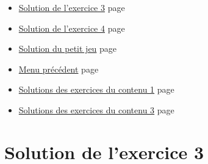 \documentclass[a4paper,11pt]{book}
\begin{document}
\clearpage

\label{orgd5de19a}
\label{page:sols-cont2}
\begin{itemize}
\item \hyperref[org34f5627]{Solution de l'exercice 3} page \pageref{page:sec8.2.1sol3}
\item \hyperref[orgea731a5]{Solution de l'exercice 4} page \pageref{page:sec8.2.2sol4}
\item \hyperref[org727e50c]{Solution du petit jeu} page \pageref{page:sec8.2.3sol-game}
\item \hyperref[orgd150cd0]{Menu précédent} page \pageref{page:sols-contents-menu}
\item \hyperref[orgdc6a2eb]{Solutions des exercices du contenu 1} page \pageref{page:sec8.1sols-cont1}
\item \hyperref[org76d02b6]{Solutions des exercices du contenu 3} page \pageref{page:sec8.3sols-cont3}
\end{itemize}

\clearpage

\section{Solution de l'exercice 3}
\label{sec:org5710084}
\label{org34f5627}
\label{page:sec8.2.1sol3}
\end{document}

